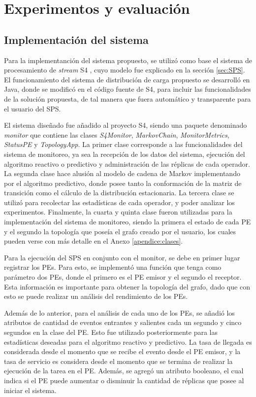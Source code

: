 \chapter{Experimentos y evaluación}
\label{cap:experimentos}

\section{Implementación del sistema}
Para la implementanción del sistema propuesto, se utilizó como base el sistema de procesamiento de \textit{stream} S4 \citep{s4}, cuyo modelo fue explicado en la sección \ref{sec:SPS}. El funcionamiento del sistema de distribución de carga propuesto se desarrolló en Java, donde se modificó en el código fuente de S4, para incluir las funcionalidades de la solución propuesta, de tal manera que fuera automático y transparente para el usuario del SPS.

El sistema diseñado fue añadido al proyecto S4, siendo una paquete denominado \textit{monitor} que contiene las clases \textit{S4Monitor}, \textit{MarkovChain}, \textit{MonitorMetrics}, \textit{StatusPE} y \textit{TopologyApp}. La primer clase corresponde a las funcionalidades del sistema de monitoreo, ya sea la recepción de los datos del sistema, ejecución del algoritmo reactivo o predictivo y administración de las réplicas de cada operador. La segunda clase hace alusión al modelo de cadena de Markov implementando por el algoritmo predictivo, donde posee tanto la conformación de la matriz de transición como el cálculo de la distribución estacionaria. La tercera clase se utilizó para recolectar las estadísticas de cada operador, y poder analizar los experimentos. Finalmente, la cuarta y quinta clase fueron utilizadas para la implementación del sistema de monitoreo, siendo la primera el estado de cada PE y el segundo la topología que poseía el grafo creado por el usuario, los cuales pueden verse con más detalle en el Anexo \ref{apendice:clases}.

Para la ejecución del SPS en conjunto con el monitor, se debe en primer lugar registrar los PEs. Para esto, se implementó una función que tenga como parámetro dos PEs, donde el primero es el PE emisor y el segundo el receptor. Esta información es importante para obtener la topología del grafo, dado que con esto se puede realizar un análisis del rendimiento de los PEs.

Además de lo anterior, para el análisis de cada uno de los PEs, se añadió los atributos de cantidad de eventos entrantes y salientes cada un segundo y cinco segundos en la clase del PE. Esto fue utilizado posteriormente para las estadísticas deseadas para el algoritmo reactivo y predictivo. La tasa de llegada es considerada desde el momento que se recibe el evento desde el PE emisor, y la tasa de servicio es considera desde el momento que se termina de realizar la ejecución de la tarea en el PE. Además, se agregó un atributo booleano, el cual indica si el PE puede aumentar o disminuir la cantidad de réplicas que posee al iniciar el sistema.

